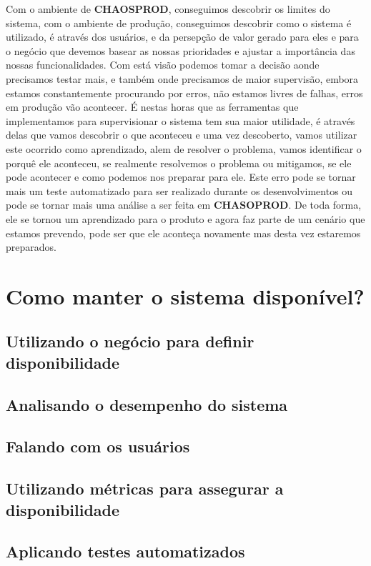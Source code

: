     Com o ambiente de \textbf{CHAOSPROD}, conseguimos descobrir os limites do
    sistema, com o ambiente de produção, conseguimos descobrir como o sistema é
    utilizado, é através dos usuários, e da persepção de valor gerado para eles
    e para o negócio que devemos basear as nossas prioridades e ajustar a
    importância das nossas funcionalidades. Com está visão podemos tomar a decisão
    aonde precisamos testar mais, e também onde precisamos de maior supervisão,
    embora estamos constantemente procurando por erros, não estamos livres de
    falhas, erros em produção vão acontecer. É nestas horas que as ferramentas
    que implementamos para supervisionar o sistema tem sua maior utilidade, é
    através delas que vamos descobrir o que aconteceu e uma vez descoberto, vamos
    utilizar este ocorrido como aprendizado, alem de resolver o problema, vamos
    identificar o porquê ele aconteceu, se realmente resolvemos o problema ou
    mitigamos, se ele pode acontecer e como podemos nos preparar para ele. Este
    erro pode se tornar mais um teste automatizado para ser realizado durante os
    desenvolvimentos ou pode se tornar mais uma análise a ser feita em
    \textbf{CHASOPROD}. De toda forma, ele se tornou um aprendizado para o produto
    e agora faz parte de um cenário que estamos prevendo, pode ser que ele
    aconteça novamente mas desta vez estaremos preparados.

  \section{Como manter o sistema disponível?}
    \subsection{Utilizando o negócio para definir disponibilidade}
    \subsection{Analisando o desempenho do sistema}
    \subsection{Falando com os usuários}
    \subsection{Utilizando métricas para assegurar a disponibilidade}
    \subsection{Aplicando testes automatizados}

